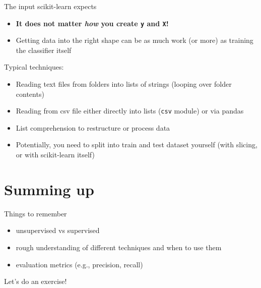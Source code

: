 \begin{frame}{The input scikit-learn expects}
  \begin{itemize}
  \item \textbf{It does not matter \emph{how} you create \texttt{y} and \texttt{X}!}
  \item Getting data into the right shape can be as much work (or more) as training the classifier itself
  \end{itemize}
  \pause
  Typical techniques:
  \begin{itemize}
  \item Reading text files from folders into lists of strings (looping over folder contents)
  \item Reading from csv file either directly into lists (\texttt{csv} module) or via pandas
  \item List comprehension to restructure or process data
  \item Potentially, you need to split into train and test dataset yourself (with slicing, or  with scikit-learn itself)
  \end{itemize}
\end{frame}












\section{Summing up}


\begin{frame}{Things to remember}
  \begin{itemize}
  \item unsupervised vs supervised
  \item rough understanding of different techniques and when to use them
  \item evaluation metrics (e.g., precision, recall)
\end{itemize}
\end{frame}

\begin{frame}[standout]
  Let's do an exercise!
\end{frame}


\begin{frame}[plain]
	\printbibliography
\end{frame}



